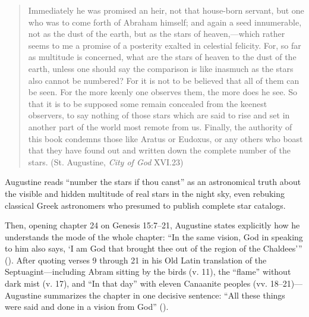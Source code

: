 \begin{quote}
Immediately he was promised an heir, not that house-born servant, but one who was to come forth of Abraham himself; and again a seed innumerable, not as the dust of the earth, but as the stars of heaven,---which rather seems to me a promise of a posterity exalted in celestial felicity. For, so far as multitude is concerned, what are the stars of heaven to the dust of the earth, unless one should say the comparison is like inasmuch as the stars also cannot be numbered? For it is not to be believed that all of them can be seen. For the more keenly one observes them, the more does he see. So that it is to be supposed some remain concealed from the keenest observers, to say nothing of those stars which are said to rise and set in another part of the world most remote from us. Finally, the authority of this book condemns those like Aratus or Eudoxus, or any others who boast that they have found out and written down the complete number of the stars. (St. Augustine, \emph{City of God} XVI.23)
\end{quote}

Augustine reads ``number the stars if thou canst'' as an astronomical truth about the visible and hidden multitude of real stars in the night sky, even rebuking classical Greek astronomers who presumed to publish complete star catalogs.

Then, opening chapter 24 on Genesis 15:7--21, Augustine states explicitly how he understands the mode of the whole chapter: ``In the same vision, God in speaking to him also says, `I am God that brought thee out of the region of the Chaldees''' (). After quoting verses 9 through 21 in his Old Latin translation of the Septuagint---including Abram sitting by the birds (v. 11), the ``flame'' without dark mist (v. 17), and ``In that day'' with eleven Canaanite peoples (vv. 18--21)---Augustine summarizes the chapter in one decisive sentence: ``All these things were said and done in a vision from God'' ().

